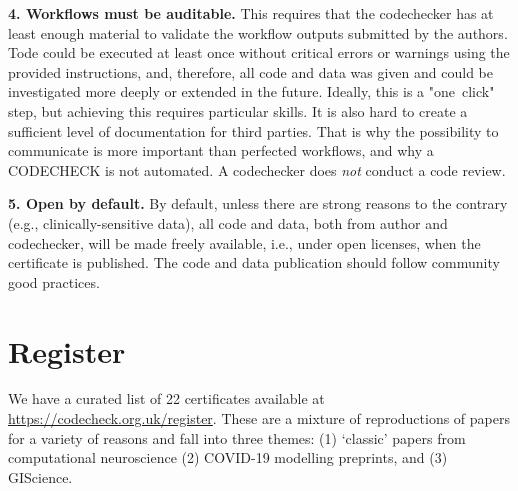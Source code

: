 \documentclass[12pt]{article}
\begin{document}
\textbf{4. Workflows must be auditable.} This requires that the codechecker 
has at least enough material to validate the workflow outputs submitted by 
the authors. Tode could be executed at least once without critical errors or
warnings using the provided instructions, and, therefore, all code and data 
was given and could be investigated more deeply or extended in the future.
Ideally, this is a "one~click" step, but achieving this requires particular 
skills. It is also hard to create a sufficient level of documentation for 
third parties. That is why the possibility to communicate is more important
than perfected workflows, and why a CODECHECK is not automated.
A codechecker does \emph{not} conduct a code review.

\textbf{5. Open by default.}  By default, unless there are strong
reasons to the contrary (e.g., clinically-sensitive data), all code and
data, both from author and codechecker, will be made freely available, i.e., 
under open licenses, when the certificate is published. The code and data 
publication should follow community good practices.

\section*{Register}\label{register}

We have a curated list of 22 certificates available at
\url{https://codecheck.org.uk/register}. These are a mixture of
reproductions of papers for a variety of reasons and fall into three themes:
(1) `classic' papers from computational neuroscience
(2) COVID-19 modelling preprints, and
(3) GIScience.  
\end{document}
